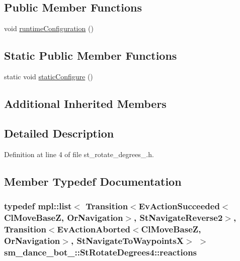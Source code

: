 \subsection*{Public Member Functions}
\begin{DoxyCompactItemize}
\item 
void \hyperlink{structsm__dance__bot__3_1_1StRotateDegrees4_aae5e7d6bcc45d1cbd57f45d45e56eee2}{runtime\+Configuration} ()
\end{DoxyCompactItemize}
\subsection*{Static Public Member Functions}
\begin{DoxyCompactItemize}
\item 
static void \hyperlink{structsm__dance__bot__3_1_1StRotateDegrees4_a0415d1e13c9baecc2abff3ed0345d8bb}{static\+Configure} ()
\end{DoxyCompactItemize}
\subsection*{Additional Inherited Members}


\subsection{Detailed Description}


Definition at line 4 of file st\+\_\+rotate\+\_\+degrees\+\_.\+h.



\subsection{Member Typedef Documentation}
\subsubsection[{\texorpdfstring{reactions}{reactions}}]{\setlength{\rightskip}{0pt plus 5cm}typedef mpl\+::list$<$ Transition$<$Ev\+Action\+Succeeded$<${\bf Cl\+Move\+BaseZ}, {\bf Or\+Navigation}$>$, {\bf St\+Navigate\+Reverse2}$>$, Transition$<$Ev\+Action\+Aborted$<${\bf Cl\+Move\+BaseZ}, {\bf Or\+Navigation}$>$, {\bf St\+Navigate\+To\+WaypointsX}$>$ $>$ {\bf sm\+\_\+dance\+\_\+bot\+\_\+::\+St\+Rotate\+Degrees4\+::reactions}}\hypertarget{structsm__dance__bot__3_1_1StRotateDegrees4_afe142f688a5c9c61206a3c47024e0a35}{}\label{structsm__dance__bot__3_1_1StRotateDegrees4_afe142f688a5c9c61206a3c47024e0a35}


